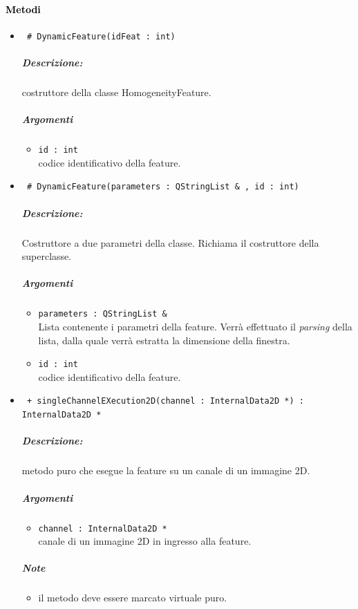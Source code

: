 \paragraph{\textcolor{black}{Metodi\\}}
	\begin{itemize}
	\item \color{blue}\verb! # DynamicFeature(idFeat : int)!
		\color{black}
		\subparagraph{Descrizione:} costruttore della classe HomogeneityFeature.
		\subparagraph{Argomenti}
			\begin{itemize}
				\item \color{RoyalPurple} \verb!id : int! \\ 
				\color{black} codice identificativo della feature\g{}.	
			\end{itemize}
			
	\item \color{blue}\verb! # DynamicFeature(parameters : QStringList & , id : int)!
		\color{black}
		\subparagraph{Descrizione:} Costruttore a due parametri della classe. Richiama il costruttore della 						superclasse.
		\subparagraph{Argomenti}
			\begin{itemize}	
				\item \color{RoyalPurple} \verb!parameters : QStringList &! \\ 
				\color{black} Lista contenente i parametri della feature\g{}. Verrà effettuato il \textit{parsing} 						della lista, dalla quale verrà estratta la dimensione della finestra.
				\item \color{RoyalPurple} \verb!id : int! \\ 
				\color{black} codice identificativo della feature\g{}.	
			\end{itemize}

	\item \color{blue}\verb! + singleChannelEXecution2D(channel : InternalData2D *) : InternalData2D *!
		\color{black}
		\subparagraph{Descrizione:} metodo puro che esegue la feature su un canale di un immagine 2D.
		\subparagraph{Argomenti}
			\begin{itemize}
				\item \color{RoyalPurple} \verb!channel : InternalData2D * ! \\ 
				\color{black} canale di un immagine 2D in ingresso alla feature.		
			\end{itemize}
		\subparagraph{Note}
			\begin{itemize}
				\item il metodo deve essere marcato virtuale puro.
			\end{itemize}
			

\end{itemize}
